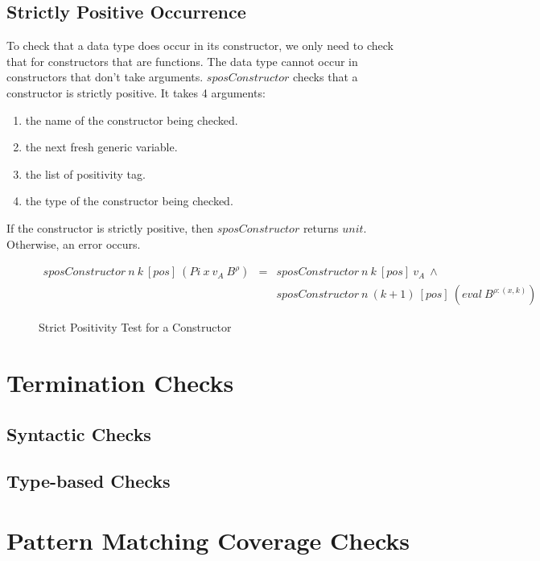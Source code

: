 \documentclass[acmsmall]{acmart}
\begin{document}
\subsection{Strictly Positive Occurrence}

To check that a data type does occur in its constructor, we only need to check that for constructors that are functions. The data type cannot occur in constructors that don't take arguments. $sposConstructor$ checks that a constructor is strictly positive. It takes 4 arguments:

\begin{enumerate}
  \item the name of the constructor being checked.
  \item the next fresh generic variable.
  \item the list of positivity tag.
  \item the type of the constructor being checked.
\end{enumerate}

If the constructor is strictly positive, then $sposConstructor$ returns $unit$. Otherwise, an error occurs.

\begin{figure}[H]
  \begin{equation*}
    \begin{aligned}
      sposConstructor \: n \: k \: [pos] \: (Pi \: x \: v_A \: B^{\rho}) & = & sposConstructor \: n \: k \: [pos] \: v_A \: \land                 \\
                                                                         &   & sposConstructor \: n \: (k+1) \: [pos] \: (eval \: B^{\rho:(x,k)})
    \end{aligned}
  \end{equation*}
  \caption{Strict Positivity Test for a Constructor}
\end{figure}

\section{Termination Checks}
\label{sec:termination}

\subsection{Syntactic Checks}

\subsection{Type-based Checks}

\section{Pattern Matching Coverage Checks}
\label{sec:pattern}
\end{document}
